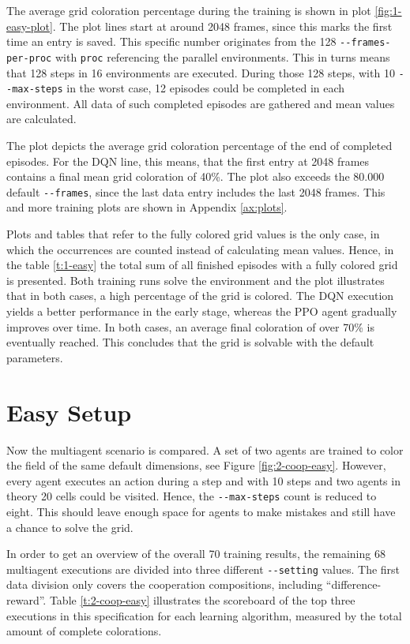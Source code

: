 The average grid coloration percentage during the training is shown in plot \ref{fig:1-easy-plot}. The plot lines start at around 2048 frames, since this marks the first time an entry is saved. This specific number originates from the 128 \verb|--frames-per-proc| with \verb|proc| referencing the parallel environments. This in turns means that 128 steps in 16 environments are executed. During those 128 steps, with 10 \verb|--max-steps| in the worst case, 12 episodes could be completed in each environment. All data of such completed episodes are gathered and mean values are calculated. 

The plot depicts the average grid coloration percentage of the end of completed episodes. For the DQN line, this means, that the first entry at 2048 frames contains a final mean grid coloration of 40\%. The plot also exceeds the 80.000 default \verb|--frames|, since the last data entry includes the last 2048 frames. This and more training plots are shown in Appendix \ref{ax:plots}.

Plots and tables that refer to the fully colored grid values is the only case, in which the occurrences are counted instead of calculating mean values. 
Hence, in the table \ref{t:1-easy} the total sum of all finished episodes with a fully colored grid is presented.
Both training runs solve the environment and the plot illustrates that in both cases, a high percentage of the grid is colored. The DQN execution yields a better performance in the early stage, whereas the PPO agent gradually improves over time. In both cases, an average final coloration of over 70\% is eventually reached. This concludes that the grid is solvable with the default parameters.

\section{Easy Setup} \label{easy_env}

Now the multiagent scenario is compared. A set of two agents are trained to color the field of the same default dimensions, see Figure \ref{fig:2-coop-easy}. However, every agent executes an action during a step and with 10 steps and two agents in theory 20 cells could be visited. Hence, the \verb|--max-steps| count is reduced to eight. This should leave enough space for agents to make mistakes and still have a chance to solve the grid.

In order to get an overview of the overall 70 training results, the remaining 68 multiagent executions are divided into three different \verb|--setting| values. The first data division only covers the cooperation compositions, including ``difference-reward''. Table \ref{t:2-coop-easy} illustrates the scoreboard of the top three executions in this specification for each learning algorithm, measured by the total amount of complete colorations. \\\\

